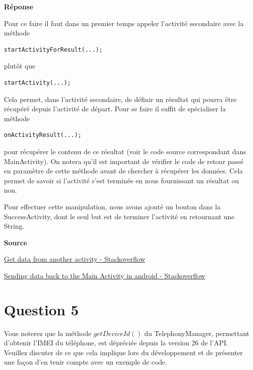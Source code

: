 \documentclass[francais,12pt]{article}
\begin{document}
		 {\color[rgb]{0,0.5,0.23}\textbf{Réponse}}
		 
		 Pour ce faire il faut dans un premier temps appeler l'activité secondaire avec la méthode 
		 
		 \begin{lstlisting}[style=javaCode]
		 startActivityForResult(...);
		 \end{lstlisting}
		 
		 plutôt que 
		 		 
		 \begin{lstlisting}[style=javaCode]
		 startActivity(...);
		 \end{lstlisting}
		 
		 Cela permet, dans l'activité secondaire, de définir un résultat qui pourra être récupéré depuis l'activité de départ. Pour se faire il suffit de spécialiser la méthode 
		 
		\begin{lstlisting}[style=javaCode]
		 onActivityResult(...);
		 \end{lstlisting}
		 
		 pour récupérer le contenu de ce résultat (voir le code source correspondant dans MainActivity). On notera qu'il est important de vérifier le code de retour passé en paramètre de cette méthode avant de chercher à récupérer les données. Cela permet de savoir si l'activité s'est terminée en nous fournissant un résultat ou non.\newline
		 
		 Pour effectuer cette manipulation, nous avons ajouté un bouton dans la SuccessActivity, dont le seul but est de terminer l'activité en retournant une String.
		 
		\textbf{Source}

        \href{https://stackoverflow.com/questions/13178056/get-data-from-another-activity}{Get data from another activity - Stackoverflow}
    
        \href{https://stackoverflow.com/questions/920306/sending-data-back-to-the-main-activity-in-android}{Sending data back to the Main Activity in android - Stackoverflow}
        
	\section*{Question 5}
		Vous noterez que la méthode $getDeviceId()$ du TelephonyManager, permettant d'obtenir l'IMEI du téléphone, est dépréciée depuis la version 26 de l'API. Veuillez discuter de ce que cela implique lors du développement et de présenter une façon d'en tenir compte avec un exemple de code. 
		
\end{document}

